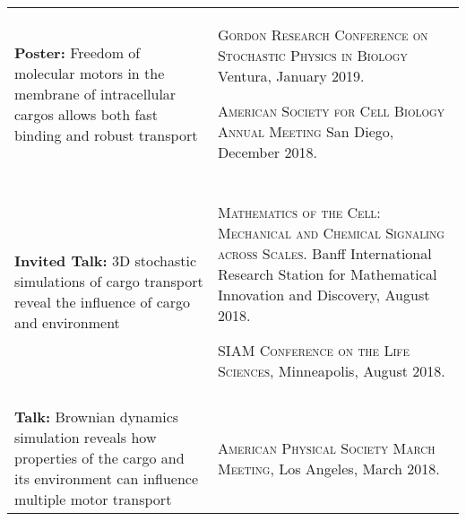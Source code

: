 \documentclass[letterpaper,10pt]{article} %
\makeatletter
\newcommand\cellwidth{\TX@col@width}
\makeatother
\begin{document}
\begin{tabularx}{\textwidth}{p{} | X}
\begin{minipage}{.4\textwidth}
\textbf{Poster:} Freedom of molecular motors in the membrane of intracellular cargos allows both fast binding and robust transport
\end{minipage}
&
\begin{minipage}{\cellwidth}
\begin{description}[itemsep=.25ex,labelsep=0em]
\item \textsc{Gordon Research Conference on Stochastic Physics in Biology} Ventura, January 2019.
\item \textsc{American Society for Cell Biology Annual Meeting} San Diego, December 2018.
\end{description}
\end{minipage} \\

\multicolumn{2}{c}{} \\

\begin{minipage}{.4\textwidth}
\textbf{Invited Talk:} 3D stochastic simulations of cargo transport reveal the influence of cargo and environment
\end{minipage}
&
\begin{minipage}{\cellwidth}
\begin{description}[itemsep=.25ex,labelsep=0em]
\item \textsc{Mathematics of the Cell: Mechanical and Chemical Signaling across Scales.} Banff International Research Station for Mathematical Innovation and Discovery, August 2018.
\item \textsc{SIAM Conference on the Life Sciences}, Minneapolis, August 2018.
\end{description}
\end{minipage} \\

\multicolumn{2}{c}{} \\

\begin{minipage}{.4\textwidth}
\textbf{Talk:} Brownian dynamics simulation reveals how properties of the cargo and its environment can influence multiple motor transport
\end{minipage}
&
\begin{minipage}{\cellwidth}
\begin{description}[itemsep=.25ex,labelsep=0em]
\item \textsc{American Physical Society March Meeting}, Los Angeles, March 2018.
\end{description}
\end{minipage} \\


\end{tabularx}
\end{document}
